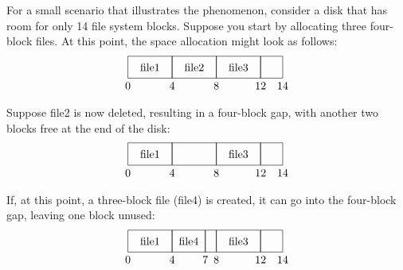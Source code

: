 For a small scenario that illustrates the phenomenon, consider a disk
that has room for only 14 file system blocks.  Suppose you start by
allocating three four-block files.  At this point, the space
allocation might look as follows:
\[\begin{tikzpicture}[scale=.035]
\draw (0,0) rectangle (40,20);
\draw (40,0) rectangle (80,20);
\draw (80,0) rectangle (120,20);
\draw (120,0) rectangle (140,20);
\draw (20,10) node{file1};
\draw (60,10) node{file2};
\draw (100,10) node{file3};
\draw (0,-7) node{0};
\draw (40,-7) node{4};
\draw (80,-7) node{8};
\draw (120,-7) node{12};
\draw (140,-7) node{14};
\end{tikzpicture}\]
\iffalse
\[\begin{graph}(150,32)(-3,-12)
\graphlinecolour{0}
\fillednodesfalse
\rectnode{a}[40,20](20,10)
\rectnode{b}[40,20](60,10)
\rectnode{c}[40,20](100,10)
\rectnode{d}[20,20](130,10)
\autonodetext{a}{file1}
\autonodetext{b}{file2}
\autonodetext{c}{file3}
\freetext(0,-7){0}
\freetext(40,-7){4}
\freetext(80,-7){8}
\freetext(120,-7){12}
\freetext(140,-7){14}
\end{graph}\]
\fi
Suppose file2 is now deleted, resulting in a four-block gap, with
another two blocks free at the end of the disk:
\[\begin{tikzpicture}[scale=.035]
\draw (0,0) rectangle (40,20);
\draw (40,0) rectangle (80,20);
\draw (80,0) rectangle (120,20);
\draw (120,0) rectangle (140,20);
\draw (20,10) node{file1};
\draw (100,10) node{file3};
\draw (0,-7) node{0};
\draw (40,-7) node{4};
\draw (80,-7) node{8};
\draw (120,-7) node{12};
\draw (140,-7) node{14};
\end{tikzpicture}\]
\iffalse
\[\begin{graph}(150,32)(-3,-12)
\graphlinecolour{0}
\fillednodesfalse
\rectnode{a}[40,20](20,10)
\rectnode{b}[40,20](60,10)
\rectnode{c}[40,20](100,10)
\rectnode{d}[20,20](130,10)
\autonodetext{a}{file1}
\autonodetext{c}{file3}
\freetext(0,-7){0}
\freetext(40,-7){4}
\freetext(80,-7){8}
\freetext(120,-7){12}
\freetext(140,-7){14}
\end{graph}\]
\fi
If, at this point, a three-block file (file4) is created, it can go
into the four-block gap, leaving one block unused:
\[\begin{tikzpicture}[scale=.035]
\draw (0,0) rectangle (40,20);
\draw (40,0) rectangle (70,20);
\draw (70,0) rectangle (80,20);
\draw (80,0) rectangle (120,20);
\draw (120,0) rectangle (140,20);
\draw (20,10) node{file1};
\draw (100,10) node{file3};
\draw (55,10) node{file4};
\draw (0,-7) node{0};
\draw (40,-7) node{4};
\draw (70,-7) node{7};
\draw (80,-7) node{8};
\draw (120,-7) node{12};
\draw (140,-7) node{14};
\end{tikzpicture}\]
